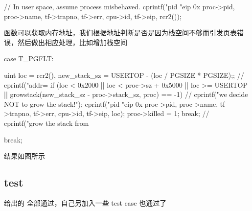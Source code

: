\begin{ccode}
    // In user space, assume process misbehaved.
    cprintf("pid %
            "eip 0x%
            proc->pid, proc->name, tf->trapno, tf->err, cpu->id, tf->eip, 
            rcr2());
\end{ccode}

 函数可以获取内存地址，我们根据地址判断是否是因为栈空间不够而引发页表错误，然后做出相应处理，比如增加栈空间

\begin{ccode}
    case T_PGFLT:
    {
        uint loc = rcr2(), new_stack_sz = USERTOP - (loc / PGSIZE * PGSIZE);;
        // cprintf("addr=%
        if (loc < 0x2000 || loc < proc->sz + 0x5000 || 
        loc >= USERTOP || growstack(new_stack_sz - proc->stack_sz, proc) == -1) {
            // cprintf("we decide NOT to grow the stack!\n");
            cprintf("pid %
                "eip 0x%
                proc->pid, proc->name, tf->trapno, tf->err, cpu->id, tf->eip, 
                loc);
            proc->killed = 1;
            break;
        }
      // cprintf("grow the stack from %
       
    }
    break;
\end{ccode}

结果如图所示


\subsection{test}

给出的  全部通过，自己另加入一些 test case 也通过了

